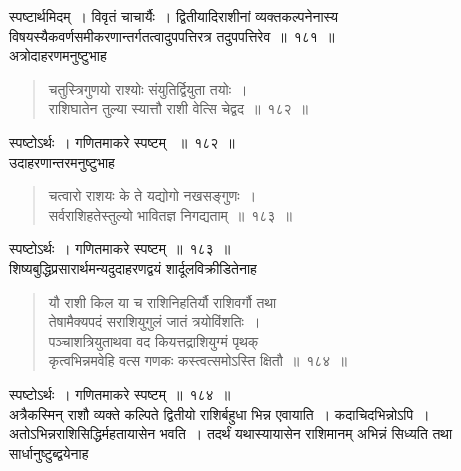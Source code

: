 \documentclass[11pt, openany]{book}
\begin{document}
 स्पष्टार्थमिदम्~। विवृतं चाचार्यैः~। द्वितीयादिराशीनां
व्यक्तकल्पनेनास्य विषयस्यैकवर्णसमीकरणान्तर्गतत्वादुपपत्तिरत्र तदुपपत्तिरेव~॥~१८१~॥~\\

\vspace{-2mm}
 अत्रोदाहरणमनुष्टुभाह\textendash
 
 \label{182}
\begin{quote}
    \eg 
      चतुस्त्रिगुणयो राश्योः संयुतिर्द्वियुता तयोः~। \\
 राशिघातेन तुल्या स्यात्तौ राशी वेत्सि चेद्वद~॥~१८२~॥~
\end{quote}

स्पष्टोऽर्थः~। गणितमाकरे स्पष्टम् ~॥~१८२~॥~\\

\vspace{-2mm}
 उदाहरणान्तरमनुष्टुभाह\textendash
\begin{quote}
    \eg 
     चत्वारो राशयः के ते यद्योगो  नखसङ्गुणः~। \\
 सर्वराशिहतेस्तुल्यो भावितज्ञ निगद्यताम्~॥~१८३~॥~
\end{quote}
 
स्पष्टोऽर्थः~। गणितमाकरे स्पष्टम्~॥~१८३~॥~\\

\vspace{-2mm}
शिष्यबुद्धिप्रसारार्थमन्यदुदाहरणद्वयं शार्दूलविक्रीडितेनाह\textendash

 \label{184}
\begin{quote}
    \eg 
    यौ राशी किल या च राशिनिहतिर्यौ राशिवर्गौ तथा \\
 तेषामैक्यपदं सराशियुगुलं जातं त्रयोविंशतिः~। \\
 पञ्चाशत्रियुताथवा वद कियत्तद्राशियुग्मं पृथक् \\
 कृत्वभिन्नमवेहि वत्स गणकः कस्त्वत्समोऽस्ति क्षितौ~॥~१८४~॥
\end{quote}
\thispagestyle{empty}
\afterpage{\fancyhead[LE,RO]{\thepage}}
\cfoot{}
 \newpage%

 स्पष्टोऽर्थः~। गणितमाकरे स्पष्टम्~॥~१८४~॥\\

\vspace{-2mm}
 अत्रैकस्मिन् राशौ व्यक्ते कल्पिते द्वितीयो राशिर्बहुधा भिन्न एवायाति~। कदाचिदभिन्नोऽपि~। अतोऽभिन्नराशिसिद्धिर्महतायासेन भवति~। तदर्थं
यथास्यायासेन राशिमानम् अभिन्नं सिध्यति तथा सार्धानुष्टुब्द्वयेनाह\textendash
\end{document}
